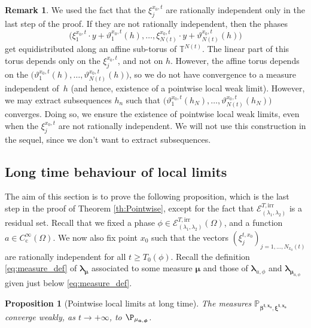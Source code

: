 \documentclass[JEP,XML,SOM,Unicode,published]{cedram}
\let\mathcal\mathscr
\newcommand{\rc}{\mathrm{c}}
\newcommand{\irr}{\mathrm{irr}}
\theoremstyle{plain}
\newtheorem{proposition}[theorem]{Proposition}
\theoremstyle{definition}
\newtheorem{remark}[theorem]{Remark}
\newcommand{\T}{\mathbb{T}}
\begin{document}
\begin{remark}
We used the fact that the $\xi_j^{x_0,t}$ are rationally independent only in the last step of the proof. If they are not rationally independent, then the phases
\[
\bigl(\xi_1^{x_0,t}\cdot y+ \vartheta_1^{x_0,t}(h), \dots, \xi_{N(t)}^{x_0,t}\cdot y + \vartheta_{N(t)}^{x_0,t}(h) \bigr)
\]
get equidistributed along an affine sub-torus of $\T^{N(t)}$. The linear part of this torus depends only on the $\xi^{x_0,t}_j$, and not on $h$.
However, the affine torus depends on the $\bigl(\vartheta_1^{x_0,t}(h),\dots, \vartheta_{N(t)}^{x_0,t}(h) \bigr)$, so we do not have convergence to a measure independent of~$h$ (and hence, existence of a pointwise local weak limit). However, we may extract subsequences $h_n$ such that $\bigl(\vartheta_1^{x_0,t}(h_N),\dots, \vartheta_{N(t)}^{x_0,t}(h_N) \bigr)$ converges. Doing so, we ensure the existence of pointwise local weak limits, even when the $\xi_j^{x_0,t}$ are not rationally independent. We will not use this construction in the sequel, since we don't want to extract subsequences.
\end{remark}

\subsection{Long time behaviour of local limits}\label{ss:long_time}
The aim of this section is to prove the following proposition, which is the last step in the proof of Theorem \ref{th:Pointwise}, except for the fact that $\mathcal{E}_{(\lambda_1,\lambda_2)}^{T, \irr}$ is a residual set. Recall that we fixed a phase $\phi \in \mathcal{E}^{T,\irr}_{(\lambda_1,\lambda_2)}(\Omega)$, and a function $a\in C_\rc^\infty(\Omega)$. We now also fix point $x_0$ such that the vectors $(\xi_j^{t,x_0})_{j=1,\dots,N_{x_0}(t)}$ are rationally independent for all $t\geq T_0(\phi)$. Recall the definition \eqref{eq:measure_def} of $\boldsymbol{\lambda_\mu}$ associated to some measure $\boldsymbol{\mu}$ and those of $\boldsymbol{\lambda}_{a,\phi}$ and $\boldsymbol{\lambda}_{\boldsymbol{\mu}_{a,\phi}}$ given just below \eqref{eq:measure_def}.

\begin{proposition}[Pointwise local limits at long time]\label{prop:LongTimeLim}
The measures $\mathbb{P}_{\boldsymbol{\beta^{t,x_0}}, \boldsymbol{\xi^{t,x_0}}}$ converge weakly, as $t\to +\infty$, to $\P_{\mu_{\boldsymbol{a},\boldsymbol{\phi}}}$.
\end{proposition}
\end{document}
